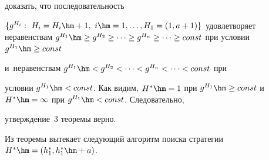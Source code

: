 доказать, что последовательность\linebreak 


$\{ g^{H_i}:\ H_i=H_i\hm+1,\ i\hm= 1,\ldots , 


H_1=(1,a+1)\}$ удовлетворяет неравенствам $g^{H_1}\hm\geq g^{H_2}\geq 


\cdots \geq g^{H_n} \geq \cdots \geq const$ при условии $g^{H_1}\hm\geq const$ 


и~неравенствам $g^{H_1}\hm< g^{H_2}<\cdots < g^{H_n} < \cdots < const$ при 


условии $g^{H_1}\hm<const$. Как видим, $H^*\hm=1$ при $g^{H_1}\hm\geq 


const$ и~$H^*\hm=\infty$ при $g^{H_1}\hm<const$. Следовательно, 


утверждение~3 теоремы верно.


  


Из теоремы вытекает следующий алгоритм поиска стратегии $H^*\hm= (h_1^*, 


h_1^*\hm+a)$.


